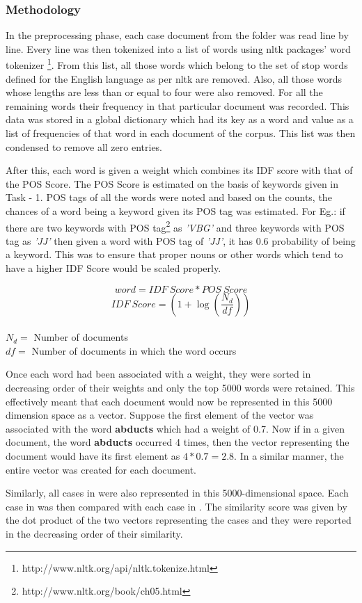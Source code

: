 \subsubsection{Methodology}

In the preprocessing phase, each case document from the  folder was read line by line. Every line was then tokenized into a list of words using nltk packages' word tokenizer \footnote{http://www.nltk.org/api/nltk.tokenize.html}. From this list, all those words which belong to the set of stop words defined for the English language as per nltk are removed. Also, all those words whose lengths are less than or equal to four were also removed. For all the remaining words their frequency in that particular document was recorded. This data was stored in a global dictionary which had its key as a word and value as a list of frequencies of that word in each document of the corpus. This list was then condensed to remove all zero entries. \par
After this, each word is given a weight which combines its IDF score with that of the POS Score. The POS Score is estimated on the basis of keywords given in Task - 1. POS tags of all the words were noted and based on the counts, the chances of a word being a keyword given its POS tag was estimated. For Eg.: if there are two keywords with POS tag\footnote{http://www.nltk.org/book/ch05.html} as \textit{'VBG'} and three keywords with POS tag as \textit{'JJ'} then given a word with POS tag of \textit{'JJ'}, it has 0.6 probability of being a keyword. This was to ensure that proper nouns or other words which tend to have a higher IDF Score would be scaled properly.


\[word = IDF\ Score * POS\ Score\]
\[IDF\ Score = (1 + \log(\frac{N_d}{df}))\]\\
\(N_d =\) Number of documents\\
\(df = \) Number of documents in which the word occurs\par
Once each word had been associated with a weight, they were sorted in decreasing order of their weights and only the top 5000 words were retained. This effectively meant that each document would now be represented in this 5000 dimension space as a vector. Suppose the first element of the vector was associated with the word \textbf{abducts} which had a weight of 0.7. Now if in a given document, the word \textbf{abducts} occurred 4 times, then the vector representing the document would have its first element as \(4 * 0.7 = 2.8\). In a similar manner, the entire vector was created for each document. \par
Similarly, all cases in  were also represented in this 5000-dimensional space. Each case in  was then compared with each case in . The similarity score was given by the dot product of the two vectors representing the cases and they were reported in the decreasing order of their similarity.

